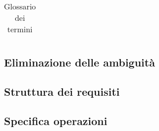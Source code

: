 \documentclass{article}
\begin{document}
\begin{table}
\begin{tabularx}{\textwidth}{|X|X|X|X|}
\end{tabularx}
\caption{Glossario dei termini}
\label{table_glossario_termini}
\end{table}

\subsection{Eliminazione delle ambiguità}

\subsection{Struttura dei requisiti}

\subsection{Specifica operazioni}

\newpage %
\end{document}
